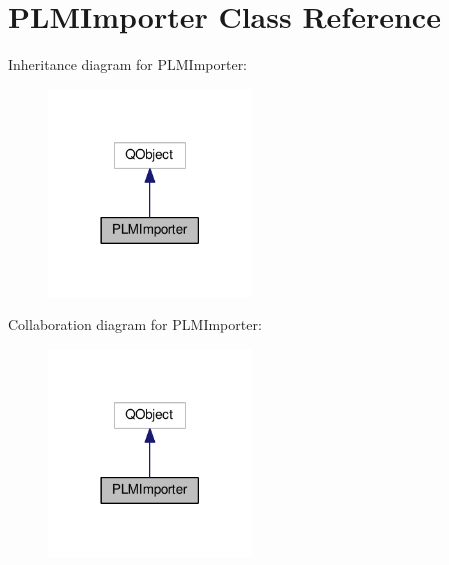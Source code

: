 \hypertarget{class_p_l_m_importer}{}\section{P\+L\+M\+Importer Class Reference}
\label{class_p_l_m_importer}


Inheritance diagram for P\+L\+M\+Importer\+:\nopagebreak
\begin{figure}[H]
\begin{center}
\leavevmode
\includegraphics[width=153pt]{class_p_l_m_importer__inherit__graph}
\end{center}
\end{figure}


Collaboration diagram for P\+L\+M\+Importer\+:\nopagebreak
\begin{figure}[H]
\begin{center}
\leavevmode
\includegraphics[width=153pt]{class_p_l_m_importer__coll__graph}
\end{center}
\end{figure}
